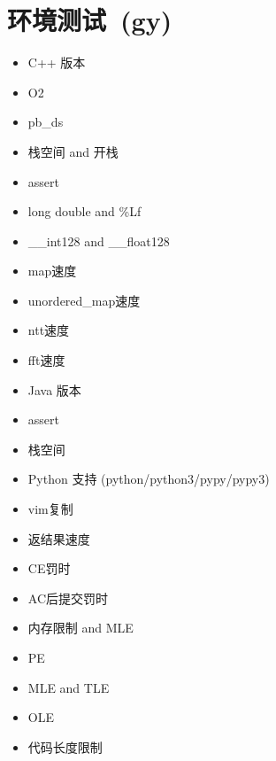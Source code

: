 \section{环境测试\ \small(gy)}
    \begin{itemize}
        \item C++ 版本
        \item O2
        \item pb\_ds
        \item 栈空间 and 开栈
        \item assert
        \item long double and \%Lf
        \item \_\_int128 and \_\_float128
        \item map速度
        \item unordered\_map速度
        \item ntt速度
        \item fft速度
        \item Java 版本
        \item assert
        \item 栈空间
        \item Python 支持 (python/python3/pypy/pypy3)
        \item vim复制
        \item 返结果速度
        \item CE罚时
        \item AC后提交罚时
        \item 内存限制 and MLE
        \item PE
        \item MLE and TLE
        \item OLE
        \item 代码长度限制
    \end{itemize}

